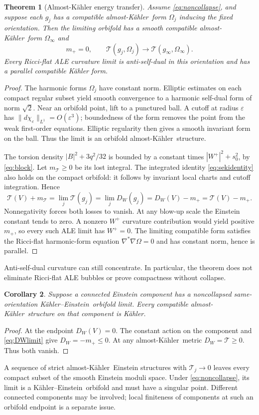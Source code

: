 \documentclass[11pt,a4paper]{article}
\newtheorem{theorem}{Theorem}[section]
\newtheorem{corollary}[theorem]{Corollary}
\theoremstyle{definition}
\theoremstyle{remark}
\newcommand{\cT}{\mathcal T}
\newcommand{\AK}{almost-K\"ahler}
\newcommand{\KE}{K\"ahler--Einstein}
\begin{document}
\begin{theorem}[Almost-K\"ahler energy transfer]\label{thm:transfer}
Assume \eqref{eq:noncollapse}, and suppose each $g_j$ has a compatible \AK\ form $\Omega_j$ inducing the fixed orientation. Then the limiting orbifold has a smooth compatible \AK\ form $\Omega_\infty$ and
\begin{equation}\label{eq:nolossplus}
 m_+=0,\qquad \cT(g_j,\Omega_j)\longrightarrow\cT(g_\infty,\Omega_\infty).
\end{equation}
Every Ricci-flat ALE curvature limit is anti-self-dual in this orientation and has a parallel compatible K\"ahler form.
\end{theorem}
\begin{proof}
The harmonic forms $\Omega_j$ have constant norm. Elliptic estimates on each compact regular subset yield smooth convergence to a harmonic self-dual form of norm $\sqrt2$. Near an orbifold point, lift to a punctured ball. A cutoff at radius $\varepsilon$ has $\|d\chi_\varepsilon\|_{L^1}=O(\varepsilon^3)$; boundedness of the form removes the point from the weak first-order equations. Elliptic regularity then gives a smooth invariant form on the ball. Thus the limit is an orbifold \AK\ structure.

The torsion density $|B|^2+3q^2/32$ is bounded by a constant times $|W^+|^2+s_0^2$, by \eqref{eq:block}. Let $m_{\cT}\ge0$ be its lost integral. The integrated identity \eqref{eq:sekidentity} also holds on the compact orbifold: it follows by invariant local charts and cutoff integration. Hence
\[
 \cT(V)+m_{\cT}=\lim_j\cT(g_j)=\lim_jD_W(g_j)=D_W(V)-m_+=\cT(V)-m_+.
\]
Nonnegativity forces both losses to vanish. At any blow-up scale the Einstein constant tends to zero. A nonzero $W^+$ curvature contribution would yield positive $m_+$, so every such ALE limit has $W^+=0$. The limiting compatible form satisfies the Ricci-flat harmonic-form equation $\nabla^*\nabla\Omega=0$ and has constant norm, hence is parallel.
\end{proof}
Anti-self-dual curvature can still concentrate. In particular, the theorem does not eliminate Ricci-flat ALE bubbles or prove compactness without collapse.

\begin{corollary}\label{cor:orbcomponent}
Suppose a connected Einstein component has a noncollapsed same-orientation \KE\ orbifold limit. Every compatible \AK\ structure on that component is K\"ahler.
\end{corollary}
\begin{proof}
At the endpoint $D_W(V)=0$. The constant action on the component and \eqref{eq:DWlimit} give $D_W=-m_+\le0$. At any \AK\ metric $D_W=\cT\ge0$. Thus both vanish.
\end{proof}
A sequence of strict \AK\ Einstein structures with $\cT_j\to0$ leaves every compact subset of the smooth Einstein moduli space. Under \eqref{eq:noncollapse}, its limit is a \KE\ orbifold and must have a singular point. Different connected components may be involved; local finiteness of components at such an orbifold endpoint is a separate issue.
\end{document}
